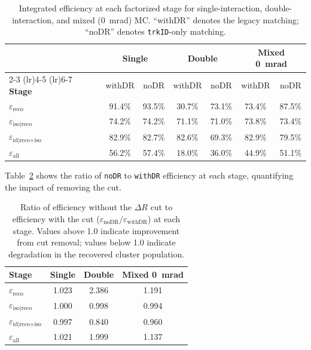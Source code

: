 \documentclass[11pt,letterpaper]{article}
\newcommand{\DR}{\ensuremath{\Delta R}}
\newcommand{\ereco}{\ensuremath{\varepsilon_{\text{reco}}}}
\newcommand{\eiso}{\ensuremath{\varepsilon_{\text{iso}|\text{reco}}}}
\newcommand{\eid}{\ensuremath{\varepsilon_{\text{id}|\text{reco+iso}}}}
\newcommand{\eall}{\ensuremath{\varepsilon_{\text{all}}}}
\begin{document}
\begin{table}[htbp]
\centering
\caption{Integrated efficiency at each factorized stage for single-interaction,
  double-interaction, and mixed (0~mrad) MC. ``withDR'' denotes the legacy
  matching; ``noDR'' denotes \texttt{trkID}-only matching.}
\label{tab:absolute}
\begin{tabular}{l cc cc cc}
\toprule
& \multicolumn{2}{c}{\textbf{Single}} & \multicolumn{2}{c}{\textbf{Double}}
& \multicolumn{2}{c}{\textbf{Mixed 0~mrad}} \\
\cmidrule(lr){2-3} \cmidrule(lr){4-5} \cmidrule(lr){6-7}
\textbf{Stage} & withDR & noDR & withDR & noDR & withDR & noDR \\
\midrule
$\ereco$       & 91.4\% & 93.5\% & 30.7\% & 73.1\% & 73.4\% & 87.5\% \\
$\eiso$        & 74.2\% & 74.2\% & 71.1\% & 71.0\% & 73.8\% & 73.4\% \\
$\eid$         & 82.9\% & 82.7\% & 82.6\% & 69.3\% & 82.9\% & 79.5\% \\
$\eall$        & 56.2\% & 57.4\% & 18.0\% & 36.0\% & 44.9\% & 51.1\% \\
\bottomrule
\end{tabular}
\end{table}

Table~\ref{tab:ratio} shows the ratio of \texttt{noDR} to \texttt{withDR}
efficiency at each stage, quantifying the impact of removing the cut.

\begin{table}[htbp]
\centering
\caption{Ratio of efficiency without the $\DR$ cut to efficiency with the cut
  ($\varepsilon_\text{noDR} / \varepsilon_\text{withDR}$) at each stage.
  Values above 1.0 indicate improvement from cut removal; values below 1.0
  indicate degradation in the recovered cluster population.}
\label{tab:ratio}
\begin{tabular}{lccc}
\toprule
\textbf{Stage} & \textbf{Single} & \textbf{Double} & \textbf{Mixed 0~mrad} \\
\midrule
$\ereco$       & 1.023 & 2.386 & 1.191 \\
$\eiso$        & 1.000 & 0.998 & 0.994 \\
$\eid$         & 0.997 & 0.840 & 0.960 \\
$\eall$        & 1.021 & 1.999 & 1.137 \\
\bottomrule
\end{tabular}
\end{table}
\end{document}

